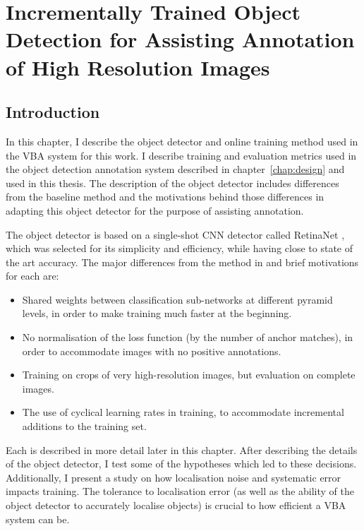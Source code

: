 \chapter{Incrementally Trained Object Detection for Assisting Annotation of High Resolution Images}
\label{chap:object_detection} 

\section{Introduction}

In this chapter, I describe the object detector and online training method used in the \gls{VBA} system for this work. I describe training and evaluation metrics used in the object detection annotation system described in chapter~\ref{chap:design} and used in this thesis.  The description of the object detector includes differences from the baseline method and the motivations behind those differences in adapting this object detector for the purpose of assisting annotation.

The object detector is based on a single-shot \gls{CNN} detector called RetinaNet \cite{Lin2017}, which was selected for its simplicity and efficiency, while having close to state of the art accuracy. The major differences from the method in \cite{Lin2017} and brief motivations for each are:

\begin{itemize}
    \item Shared weights between classification sub-networks at different pyramid levels, in order to make training much faster at the beginning.
    \item No normalisation of the loss function (by the number of anchor matches), in order to accommodate images with no positive annotations.
    \item Training on crops of very high-resolution images, but evaluation on complete images.
    \item The use of cyclical learning rates in training, to accommodate incremental additions to the training set.
\end{itemize}

Each is described in more detail later in this chapter. After describing the details of the object detector, I test some of the hypotheses which led to these decisions. Additionally, I present a study on how localisation noise and systematic error impacts training. The tolerance to localisation error (as well as the ability of the object detector to accurately localise objects) is crucial to how efficient a \gls{VBA} system can be.

